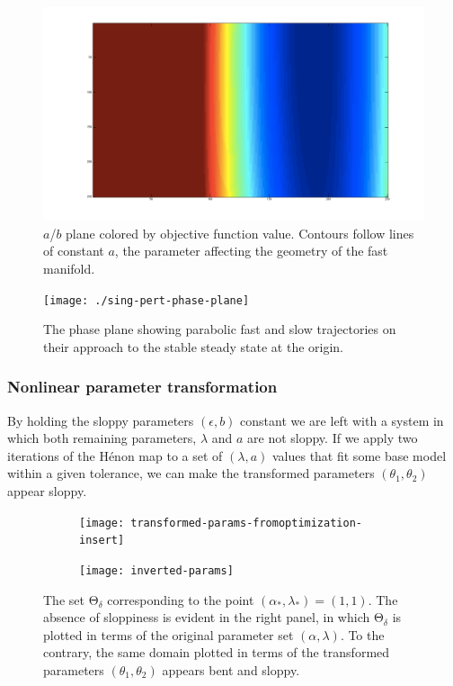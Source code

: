 \documentclass[11pt]{article}
\newcommand{\ps}{\mathrm{\Theta}}
\newcommand{\p}{\theta}
\begin{document}
\begin{figure}[htbp]
  \centering
  \includegraphics[width=\linewidth]{zagaris-ab-contours}
  \caption{$a$/$b$ plane colored by objective function value. Contours follow lines of constant $a$, the parameter affecting the geometry of the fast manifold.}
\end{figure}

\begin{figure}[htbp]
  \centering
  \texttt{[image: ./sing-pert-phase-plane]}
  \caption{The phase plane showing parabolic fast and slow
    trajectories on their approach to the stable steady state at the origin.}
\end{figure}


\subsubsection{Nonlinear parameter transformation}

By holding the sloppy parameters $(\epsilon, b)$ constant we are left
with a system in which both remaining parameters, $\lambda$ and $a$
are not sloppy. If we apply two iterations of the H\'{e}non map to a
set of $(\lambda, a)$ values that fit some base model within a given
tolerance, we can make the transformed parameters $(\theta_1,
\theta_2)$ appear sloppy.

\begin{figure}[ht!]
  \begin{subfigure}[t]{0.49\textwidth}
    \centering
    \texttt{[image: transformed-params-fromoptimization-insert]}
  \end{subfigure}
  \begin{subfigure}[t]{0.49\textwidth}
    \centering
    \texttt{[image: inverted-params]}
  \end{subfigure} %
  \caption{The set $\ps_\delta$ corresponding to the point
    $(\alpha_*,\lambda_*) = (1,1)$. The absence of
    sloppiness is evident in the right panel, in which $\ps_\delta$ is
    plotted in terms of the original parameter set
    $(\alpha,\lambda)$. To the contrary, the same domain plotted in
    terms of the transformed parameters $(\p_1,\p_2)$ appears bent and
    sloppy. \label{f.transf-params}}
\end{figure}
\end{document}
